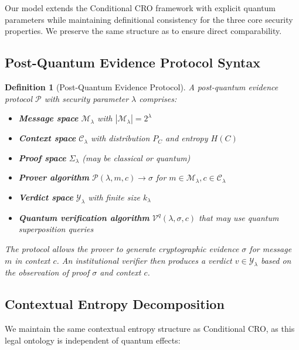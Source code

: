 \documentclass{ieeeaccess}
\newtheorem{definition}{Definition}[section]
\begin{document}
Our model extends the Conditional CRO framework with explicit quantum parameters while maintaining definitional consistency for the three core security properties. We preserve the same structure as \cite[Section III]{Minka2026CRO} to ensure direct comparability.

\subsection{Post-Quantum Evidence Protocol Syntax}

\begin{definition}[Post-Quantum Evidence Protocol]
A post-quantum evidence protocol $\mathcal{P}$ with security parameter $\lambda$ comprises:
\begin{itemize}
    \item \textbf{Message space} $\mathcal{M}_\lambda$ with $|\mathcal{M}_\lambda| = 2^\lambda$
    \item \textbf{Context space} $\mathcal{C}_\lambda$ with distribution $P_C$ and entropy $H(C)$
    \item \textbf{Proof space} $\Sigma_\lambda$ (may be classical or quantum)
    \item \textbf{Prover algorithm} $\mathcal{P}(\lambda, m, c) \to \sigma$ for $m \in \mathcal{M}_\lambda, c \in \mathcal{C}_\lambda$
    \item \textbf{Verdict space} $\mathcal{Y}_\lambda$ with finite size $k_\lambda$
    \item \textbf{Quantum verification algorithm} $\mathcal{V}^q(\lambda, \sigma, c)$ that may use quantum superposition queries
\end{itemize}
The protocol allows the prover to generate cryptographic evidence $\sigma$ for message $m$ in context $c$. An institutional verifier then produces a verdict $v \in \mathcal{Y}_\lambda$ based on the observation of proof $\sigma$ and context $c$.
\end{definition}

\subsection{Contextual Entropy Decomposition}

We maintain the same contextual entropy structure as Conditional CRO, as this legal ontology is independent of quantum effects:
\end{document}
